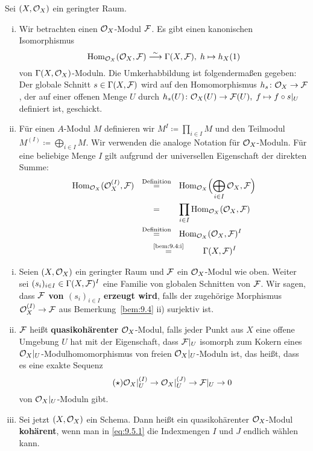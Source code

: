\begin{bem}
\label{bem:9.4}
	Sei $(X,\mathcal{O}_X)$ ein geringter Raum.
	\begin{enumerate}[i)]
		\item\label{bem:9.4:i} Wir betrachten einen $\mathcal{O}_X$-Modul $\mathcal{F}$. Es gibt einen kanonischen Isomorphismus
		\[
			\operatorname{Hom}_{\mathcal{O}_X}(\mathcal{O}_X,\mathcal{F}) \overset{\sim}{\longrightarrow} \Gamma(X,\mathcal{F}),\; h \mapsto h_X(1)
		\]
		von $\Gamma(X,\mathcal{O}_X)$-Moduln. Die Umkerhabbildung ist folgendermaßen gegeben: Der globale Schnitt $s \in \Gamma(X,\mathcal{F})$ wird auf den Homomorphismus $h_s\colon \mathcal{O}_X \to \mathcal{F}$, der auf einer offenen Menge $U$ durch $h_s(U)\colon \mathcal{O}_X(U) \to \mathcal{F}(U),\; f \mapsto f \circ s\vert_U$ definiert ist, geschickt.
		\item Für einen $A$-Modul $M$ definieren wir $M^I \coloneqq \prod_{i\in I}M$ und den Teilmodul $M^{(I)} \coloneqq \bigoplus_{i\in I} M$. Wir verwenden die analoge Notation für $\mathcal{O}_X$-Moduln. Für eine beliebige Menge $I$ gilt aufgrund der universellen Eigenschaft der direkten Summe:
		\begin{align*}
			\Hom_{\mco_X}(\mco_X^{(I)},\mcf) \qquad &\overset{\mathclap{\text{Definition}}}{=} \qquad \Hom_{\mco_X}\Bigl(\bigoplus_{i\in I}\mco_X,\mcf\Bigr)\\
			&= \qquad \prod_{i\in I} \Hom_{\mco_X}(\mco_X,\mcf)\\
			&\overset{\mathclap{\text{Definition}}}{=} \qquad \Hom_{\mco_X}(\mco_X,\mcf)^I\\
			&\overset{\text{\ref{bem:9.4:i}}}{=} \qquad \Gamma(X,\mcf)^I
		\end{align*}	 
	\end{enumerate}
\end{bem}

\begin{defn}
\label{defn:9.5}
	\begin{enumerate}[i)]
		\item Seien $(X,\mathcal{O}_X)$ ein geringter Raum und $\mathcal{F}$ ein $\mathcal{O}_X$-Modul wie oben. Weiter sei $(s_i)_{i\in I}\in \Gamma(X,\mathcal{F})^I$ eine Familie von globalen Schnitten von $\mathcal{F}$. Wir sagen, dass \textbf{$\mathcal{F}$ von $(s_i)_{i\in I}$ erzeugt wird}, falls der zugehörige Morphismus $\mathcal{O}_X^{(I)}\to \mathcal{F}$ aus Bemerkung~\ref{bem:9.4} ii) surjektiv ist.
		\item $\mathcal{F}$ heißt \textbf{quasikohärenter} $\mathcal{O}_X$-Modul, falls jeder Punkt aus $X$ eine offene Umgebung $U$ hat mit der Eigenschaft, dass $\mathcal{F}\vert_U$ isomorph zum Kokern eines $\mathcal{O}_X\vert_U$-Modulhomomorphismus von freien $\mathcal{O}_X\vert_U$-Moduln ist, das heißt, dass es eine exakte Sequenz
		\begin{equation*}
		\label{eq:9.5.1}\tag{$\star$}
			\mathcal{O}_X\vert_U^{(I)} \to \mathcal{O}_X\vert_U^{(J)} \to \mathcal{F}\vert_U \to 0
		\end{equation*}
		von $\mathcal{O}_X\vert_U$-Moduln gibt.
		\item Sei jetzt $(X,\mathcal{O}_X)$ ein Schema. Dann heißt ein quasikohärenter $\mathcal{O}_X$-Modul \textbf{kohärent}, wenn man in \eqref{eq:9.5.1} die Indexmengen $I$ und $J$ endlich wählen kann.
	\end{enumerate}
\end{defn}

